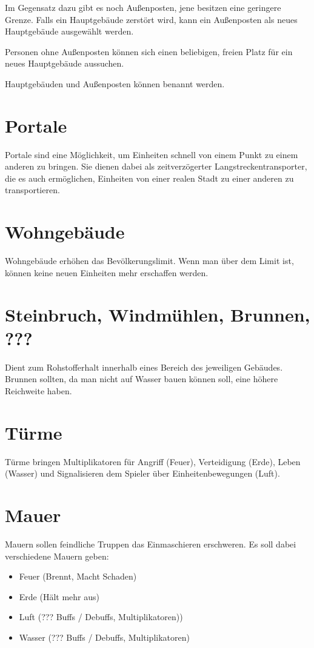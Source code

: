 Im Gegensatz dazu gibt es noch Außenposten, jene besitzen eine geringere Grenze. Falls ein Hauptgebäude zerstört wird, kann ein Außenposten als neues Hauptgebäude ausgewählt werden.

Personen ohne Außenposten können sich einen beliebigen, freien Platz für ein neues Hauptgebäude aussuchen.

Hauptgebäuden und Außenposten können benannt werden.

\section{Portale}
Portale sind eine Möglichkeit, um Einheiten schnell von einem Punkt zu einem anderen zu bringen. Sie dienen dabei als zeitverzögerter Langstreckentransporter, die es auch ermöglichen, Einheiten von einer realen Stadt zu einer anderen zu transportieren.

\section{Wohngebäude}
Wohngebäude erhöhen das Bevölkerungslimit. Wenn man über dem Limit ist, können keine neuen Einheiten mehr erschaffen werden.

\section{Steinbruch, Windmühlen, Brunnen, ???}
Dient zum Rohstofferhalt innerhalb eines Bereich des jeweiligen Gebäudes. Brunnen sollten, da man nicht auf Wasser bauen können soll, eine höhere Reichweite haben.

\section{Türme}
Türme bringen Multiplikatoren für Angriff (Feuer), Verteidigung (Erde), Leben (Wasser) und Signalisieren  dem Spieler über Einheitenbewegungen (Luft). 


\section{Mauer}
Mauern sollen feindliche Truppen das Einmaschieren erschweren. Es soll dabei verschiedene Mauern geben:

\begin{itemize}
\item Feuer (Brennt, Macht Schaden)
\item Erde (Hält mehr aus)
\item Luft (??? Buffs / Debuffs, Multiplikatoren))
\item Wasser (??? Buffs / Debuffs, Multiplikatoren)
\end{itemize}

